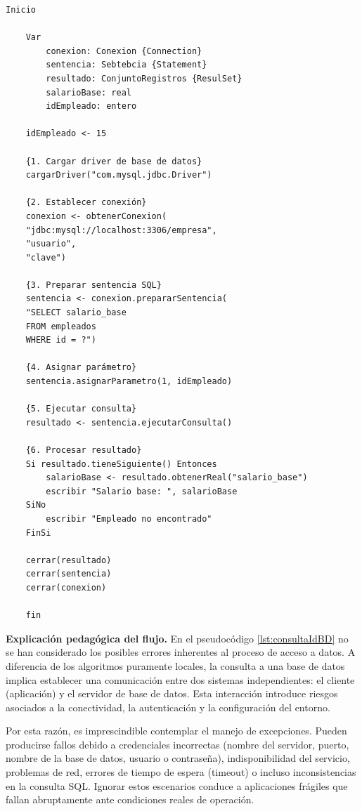 \documentclass[12pt,twoside]{book}
\begin{document}
					\begin{lstlisting}[style=upsamStyle,caption={Pseudocódigo: Variables leídas desde una base de datos.},label={lst:consultaIdBD},basicstyle=\small\ttfamily]
	Inicio
	
	Var
		conexion: Conexion {Connection}
		sentencia: Sebtebcia {Statement}
		resultado: ConjuntoRegistros {ResulSet}
		salarioBase: real
		idEmpleado: entero
	
	idEmpleado <- 15
	
	{1. Cargar driver de base de datos}
	cargarDriver("com.mysql.jdbc.Driver")
	
	{2. Establecer conexión}
	conexion <- obtenerConexion(
	"jdbc:mysql://localhost:3306/empresa",
	"usuario",
	"clave")
	
	{3. Preparar sentencia SQL}
	sentencia <- conexion.prepararSentencia(
	"SELECT salario_base 
	FROM empleados 
	WHERE id = ?")
	
	{4. Asignar parámetro}
	sentencia.asignarParametro(1, idEmpleado)
	
	{5. Ejecutar consulta}
	resultado <- sentencia.ejecutarConsulta()
	
	{6. Procesar resultado}
	Si resultado.tieneSiguiente() Entonces
		salarioBase <- resultado.obtenerReal("salario_base")
		escribir "Salario base: ", salarioBase
	SiNo
		escribir "Empleado no encontrado"
	FinSi
	
	cerrar(resultado)
	cerrar(sentencia)
	cerrar(conexion)
	
	fin \end{lstlisting}
					
					\noindent		
					\textbf{Explicación pedagógica del flujo.}
					En el pseudocódigo \ref{lst:consultaIdBD} no se han considerado los posibles errores inherentes al proceso de acceso a datos. A diferencia de los algoritmos puramente locales, la consulta a una base de datos implica establecer una comunicación entre dos sistemas independientes: el cliente (aplicación) y el servidor de base de datos. Esta interacción introduce riesgos asociados a la conectividad, la autenticación y la configuración del entorno.
					
					Por esta razón, es imprescindible contemplar el manejo de excepciones. Pueden producirse fallos debido a credenciales incorrectas (nombre del servidor, puerto, nombre de la base de datos, usuario o contraseña), indisponibilidad del servicio, problemas de red, errores de tiempo de espera (timeout) o incluso inconsistencias en la consulta SQL. Ignorar estos escenarios conduce a aplicaciones frágiles que fallan abruptamente ante condiciones reales de operación.
					
\end{document}

